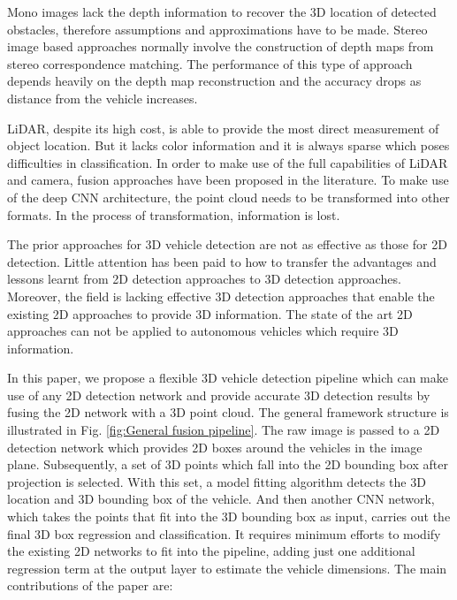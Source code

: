 \documentclass[letterpaper, 10 pt, conference]{ieeeconf}  \usepackage[
\begin{document}
Mono images lack the depth information to recover the 3D location of detected obstacles, therefore assumptions and approximations have to be made. Stereo image based approaches normally involve the construction of depth maps from stereo correspondence matching. The performance of this type of approach depends heavily on the depth map reconstruction and the accuracy drops as distance from the vehicle increases.

LiDAR, despite its high cost, is able to provide the most direct measurement of object location. But it lacks color information and it is always sparse which poses difficulties in classification. In order to make use of the full capabilities of LiDAR and camera, fusion approaches have been proposed in the literature. To make use of the deep CNN architecture, the point cloud needs to be transformed into other formats. In the process of transformation, information is lost.













The prior approaches for 3D vehicle detection are not as effective as those for 2D detection. Little attention has been paid to how to transfer the advantages and lessons learnt from 2D detection approaches to 3D detection approaches. Moreover, the field is lacking effective 3D detection approaches that enable the existing 2D approaches to provide 3D information. The state of the art 2D approaches can not be applied to autonomous vehicles which require 3D information.

In this paper, we propose a flexible 3D vehicle detection pipeline which can make use of any 2D detection network and provide accurate 3D detection results by fusing the 2D network with a 3D point cloud. The general framework structure is illustrated in Fig. \ref{fig:General fusion pipeline}. The raw image is passed to a 2D detection network which provides 2D boxes around the vehicles in the image plane. Subsequently, a set of 3D points which fall into the 2D bounding box after projection is selected.  With this set, a model fitting algorithm detects the 3D location and 3D bounding box of the vehicle. And then another CNN network, which takes the points that fit into the 3D bounding box as input, carries out the final 3D box regression and classification. It requires minimum efforts to modify the existing 2D networks to fit into the pipeline, adding just one additional regression term at the output layer to estimate the vehicle dimensions. The main contributions of the paper are:
\end{document}
